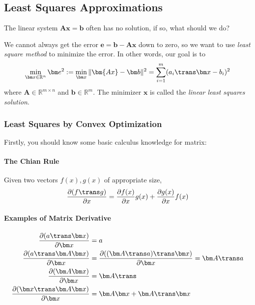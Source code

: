\subsection{Least Squares Approximations}
The linear system $\bm{Ax}=\bm b$ often has no solution, if so, what should we do?

We cannot always get the error $\bm e=\bm b-\bm{Ax}$ down to zero, so we want to use \textit{least square method} to minimize the error. In other words, our goal is to
\[
\min_{\bm x\in\mathbb{R}^n}\bm e^2:=\min_{\bm x}\|\bm{Ax}-\bm b\|^2=\sum_{i=1}^{m}(a_i\trans\bm x-b_i)^2
\]
where $\bm A\in\mathbb{R}^{m\times n}$ and $\bm b\in\mathbb{R}^m$. The minimizer $\bm x$ is called the \emph{linear least squares solution}.

\subsubsection{Least Squares by Convex Optimization}
Firstly, you should know some basic calculus knowledge for matrix:
\paragraph{The Chian Rule} Given two vectors $f(x),g(x)$ of appropriate size,
\[
\frac{\partial(f\trans g)}{\partial x}=\frac{\partial f(x)}{\partial x}g(x)+\frac{\partial g(x)}{\partial x}f(x)
\]
\paragraph{Examples of Matrix Derivative}
\begin{align}
\frac{\partial(a\trans \bm x)}{\partial \bm x}&=a\\
\frac{\partial(a\trans \bm A\bm x)}{\partial \bm x}&=\frac{\partial((\bm A\trans a)\trans\bm x)}{\partial \bm x}=\bm A\trans a\\
\frac{\partial(\bm A\bm x)}{\partial \bm x}&=\bm A\trans\\
\frac{\partial(\bm x\trans\bm A\bm x)}{\partial \bm x}&=\bm A\bm x+\bm A\trans\bm x
\end{align}

